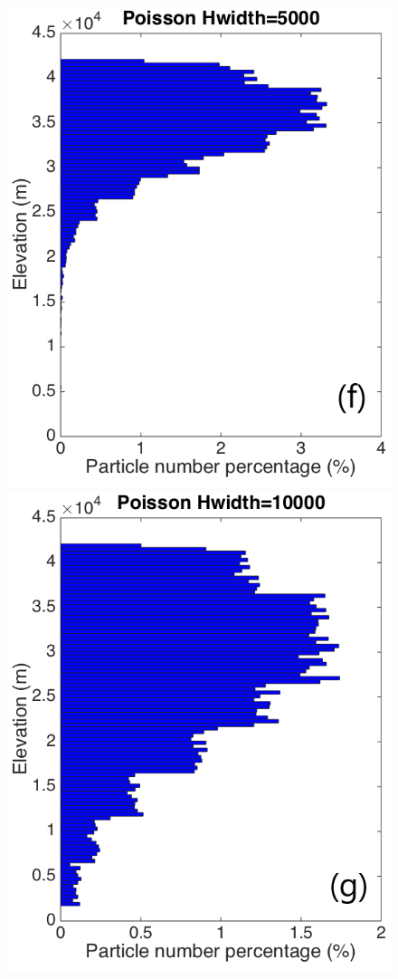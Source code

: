 \documentclass[draft,linenumbers]{agujournal2019}
\begin{document}
\begin{figure}[!htb]
\begin{minipage}{.325 \textwidth}
        \includegraphics[width=0.99 \textwidth]{Figures/Possion-Hwidth5k-ParticleDis-z}
    \end{minipage}%
    \begin{minipage}{.325 \textwidth}
        \centering
        \includegraphics[width=0.99 \textwidth]{Figures/Possion-Hwidth10k-ParticleDis-z}

\end{minipage}
\end{figure}
\end{document}
